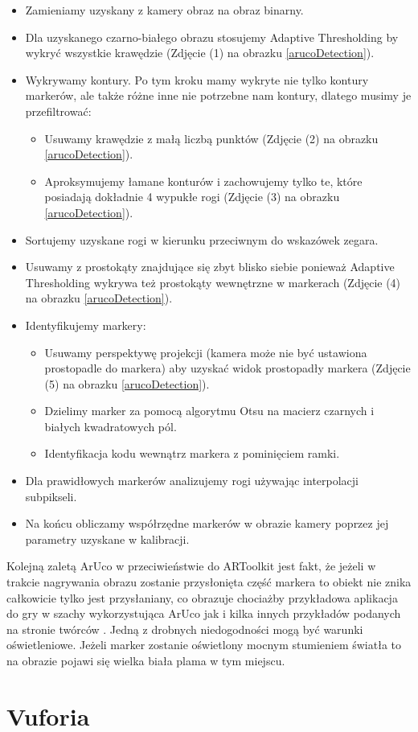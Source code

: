 \begin{itemize}
	\item Zamieniamy uzyskany z kamery obraz na obraz binarny.
	\item Dla uzyskanego czarno-białego obrazu stosujemy Adaptive Thresholding by wykryć wszystkie krawędzie (Zdjęcie (1) na obrazku \ref{arucoDetection}).
	\item Wykrywamy kontury. Po tym kroku mamy wykryte nie tylko kontury markerów, ale także różne inne nie potrzebne nam kontury, dlatego musimy je przefiltrować:
	\begin{itemize}
		\item Usuwamy krawędzie z małą liczbą punktów (Zdjęcie (2) na obrazku \ref{arucoDetection}).
		\item Aproksymujemy łamane konturów i zachowujemy tylko te, które posiadają dokładnie 4 wypukłe rogi (Zdjęcie (3) na obrazku \ref{arucoDetection}).
	\end{itemize}
	\item Sortujemy uzyskane rogi w kierunku przeciwnym do wskazówek zegara.
	\item Usuwamy z prostokąty znajdujące się zbyt blisko siebie ponieważ Adaptive Thresholding wykrywa też prostokąty wewnętrzne w markerach (Zdjęcie (4) na obrazku \ref{arucoDetection}).
	\item Identyfikujemy markery:
	\begin{itemize}
		\item Usuwamy perspektywę projekcji (kamera może nie być ustawiona prostopadle do markera) aby uzyskać widok prostopadły markera (Zdjęcie (5) na obrazku \ref{arucoDetection}).
		\item Dzielimy marker za pomocą algorytmu Otsu na macierz czarnych i białych kwadratowych pól.
		\item Identyfikacja kodu wewnątrz markera z pominięciem ramki.
	\end{itemize}
	\item Dla prawidłowych markerów analizujemy rogi używając interpolacji subpikseli.
	\item Na końcu obliczamy współrzędne markerów w obrazie kamery poprzez jej parametry uzyskane w kalibracji.
\end{itemize}

Kolejną zaletą ArUco w przeciwieństwie do ARToolkit jest fakt, że jeżeli w trakcie nagrywania obrazu zostanie przysłonięta część markera to obiekt nie znika całkowicie tylko jest przysłaniany, co obrazuje chociażby przykładowa aplikacja do gry w szachy wykorzystująca ArUco \cite{AugmentedRealityChess} jak i kilka innych przykładów podanych na stronie twórców \cite{ArUco}. Jedną z drobnych niedogodności mogą być warunki oświetleniowe. Jeżeli marker zostanie oświetlony mocnym stumieniem światła to na obrazie pojawi się wielka biała plama w tym miejscu.


\section{Vuforia}
\label{sec:vuforia}


